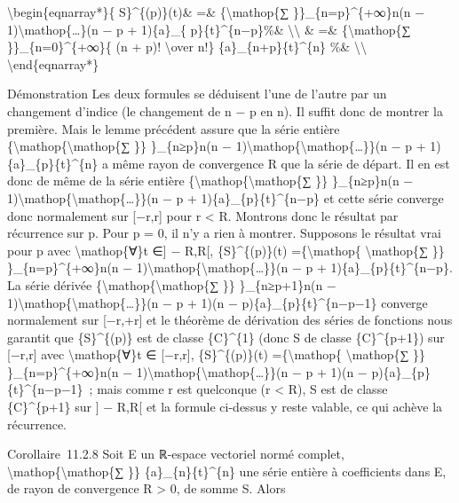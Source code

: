 \documentclass[]{article}
\begin{document}
\textbackslash{}begin\{eqnarray*\}\{ S\}\^{}\{(p)\}(t)\& =\&
\{\textbackslash{}mathop\{∑ \}\}\_\{n=p\}\^{}\{+∞\}n(n −
1)\textbackslash{}mathop\{\ldots{}\}(n − p + 1)\{a\}\_\{
p\}\{t\}\^{}\{n−p\}\%\& \textbackslash{}\textbackslash{} \& =\&
\{\textbackslash{}mathop\{∑ \}\}\_\{n=0\}\^{}\{+∞\}\{ (n + p)!
\textbackslash{}over n!\} \{a\}\_\{n+p\}\{t\}\^{}\{n\} \%\&
\textbackslash{}\textbackslash{} \textbackslash{}end\{eqnarray*\}

Démonstration Les deux formules se déduisent l'une de l'autre par un
changement d'indice (le changement de n − p en n). Il suffit donc de
montrer la première. Mais le lemme précédent assure que la série entière
\{\textbackslash{}mathop\{\textbackslash{}mathop\{∑ \}\} \}\_\{n≥p\}n(n
− 1)\textbackslash{}mathop\{\textbackslash{}mathop\{\ldots{}\}\}(n − p +
1)\{a\}\_\{p\}\{t\}\^{}\{n\} a même rayon de convergence R que la série
de départ. Il en est donc de même de la série entière
\{\textbackslash{}mathop\{\textbackslash{}mathop\{∑ \}\} \}\_\{n≥p\}n(n
− 1)\textbackslash{}mathop\{\textbackslash{}mathop\{\ldots{}\}\}(n − p +
1)\{a\}\_\{p\}\{t\}\^{}\{n−p\} et cette série converge donc normalement
sur {[}−r,r{]} pour r \textless{} R. Montrons donc le résultat par
récurrence sur p. Pour p = 0, il n'y a rien à montrer. Supposons le
résultat vrai pour p avec \textbackslash{}mathop\{∀\}t ∈{]} − R,R{[},
\{S\}\^{}\{(p)\}(t) =\{\textbackslash{}mathop\{
\textbackslash{}mathop\{∑ \}\} \}\_\{n=p\}\^{}\{+∞\}n(n −
1)\textbackslash{}mathop\{\textbackslash{}mathop\{\ldots{}\}\}(n − p +
1)\{a\}\_\{p\}\{t\}\^{}\{n−p\}. La série dérivée
\{\textbackslash{}mathop\{\textbackslash{}mathop\{∑ \}\}
\}\_\{n≥p+1\}n(n −
1)\textbackslash{}mathop\{\textbackslash{}mathop\{\ldots{}\}\}(n − p +
1)(n − p)\{a\}\_\{p\}\{t\}\^{}\{n−p−1\} converge normalement sur
{[}−r,+r{]} et le théorème de dérivation des séries de fonctions nous
garantit que \{S\}\^{}\{(p)\} est de classe \{C\}\^{}\{1\} (donc S de
classe \{C\}\^{}\{p+1\}) sur {[}−r,r{]} avec
\textbackslash{}mathop\{∀\}t ∈ {[}−r,r{]}, \{S\}\^{}\{(p)\}(t)
=\{\textbackslash{}mathop\{ \textbackslash{}mathop\{∑ \}\}
\}\_\{n=p\}\^{}\{+∞\}n(n −
1)\textbackslash{}mathop\{\textbackslash{}mathop\{\ldots{}\}\}(n − p +
1)(n − p)\{a\}\_\{p\}\{t\}\^{}\{n−p−1\}~; mais comme r est quelconque (r
\textless{} R), S est de classe \{C\}\^{}\{p+1\} sur {]} − R,R{[} et la
formule ci-dessus y reste valable, ce qui achève la récurrence.

Corollaire~11.2.8 Soit E un ℝ-espace vectoriel normé complet,
\textbackslash{}mathop\{\textbackslash{}mathop\{∑ \}\}
\{a\}\_\{n\}\{t\}\^{}\{n\} une série entière à coefficients dans E, de
rayon de convergence R \textgreater{} 0, de somme S. Alors
\end{document}

